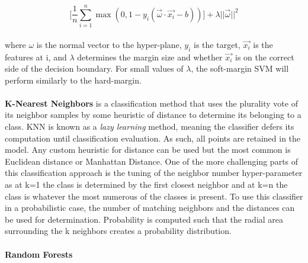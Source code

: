 \begin{equation}
    \Big[ \frac{1}{n}\sum^n_{i=1}\max(0,1-y_i(\vec{\omega} \cdot \vec{x_i} - b))\Big] + \lambda ||\vec{\omega}||^2
\end{equation}
\\
where $\omega$ is the normal vector to the hyper-plane, $y_i$ is the target, $\vec{x_i}$ is the features at i, and $\lambda$ determines the margin size and whether $\vec{x_i}$ is on the correct side of the decision boundary. For small values of $\lambda$, the soft-margin SVM will perform similarly to the hard-margin.
\\
\\
\textbf{K-Nearest Neighbors} is a classification method that uses the plurality vote of its neighbor samples by some heuristic of distance to determine its belonging to a class. KNN is known as a \textit{lazy learning} method, meaning the classifier defers its computation until classification evaluation. As such, all points are retained in the model. Any custom heuristic for distance can be used but the most common is Euclidean distance or Manhattan Distance. One of the more challenging parts of this classification approach is the tuning of the neighbor number hyper-parameter as at k=1 the class is determined by the first closest neighbor and at k=n the class is whatever the most numerous of the classes is present. To use this classifier in a probabilistic case, the number of matching neighbors and the distances can be used for determination. Probability is computed such that the radial area surrounding the k neighbors creates a probability distribution. \cite{cheng_evaluating_2009}
\\
\\
\textbf{Random Forests}
\\


